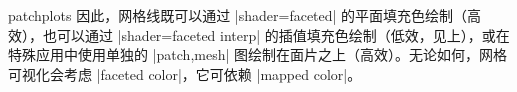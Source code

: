 {\begin{pgfplotslibrary}{patchplots}
因此，网格线既可以通过 |shader=faceted| 的平面填充色绘制（高效），也可以通过
|shader=faceted interp| 的插值填充色绘制（低效，见上），或在特殊应用中使用单独的
|patch,mesh| 图绘制在面片之上（高效）。无论如何，网格可视化会考虑
|faceted color|，它可依赖 |mapped color|。

\end{pgfplotslibrary}
}
